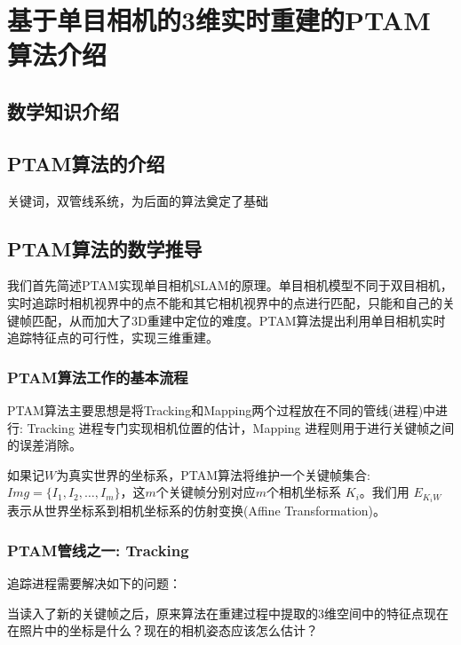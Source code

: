 
\def \R2{\mathbb{R}^2}
\def \R3{\mathbb{R}^3}
\def \Rn{\mathbb{R}^n}

\def \itW{\mathit{W}}

\def \itK{\mathit{K}}
\def \bfp{\mathbf{p}}

\chapter{基于单目相机的3维实时重建的PTAM算法介绍}

\section{数学知识介绍}

\section{PTAM算法的介绍}
关键词，双管线系统，为后面的算法奠定了基础

\section{PTAM算法的数学推导}
我们首先简述PTAM实现单目相机SLAM的原理。单目相机模型不同于双目相机，实时追踪时相机视界中的点不能和其它相机视界中的点进行匹配，只能和自己的关键帧匹配，从而加大了3D重建中定位的难度。PTAM算法提出利用单目相机实时追踪特征点的可行性，实现三维重建。

\subsection{PTAM算法工作的基本流程}
PTAM算法主要思想是将Tracking和Mapping两个过程放在不同的管线(进程)中进行: Tracking 进程专门实现相机位置的估计，Mapping 进程则用于进行关键帧之间的误差消除。

如果记$\itW$为真实世界的坐标系，PTAM算法将维护一个关键帧集合: $Img=\{I_1,I_2,\ldots,I_m\}$，这\(m\)个关键帧分别对应\(m\)个相机坐标系 $\itK_i$。我们用 $E_{\itK_i\itW}$ 表示从世界坐标系到相机坐标系的仿射变换(Affine Transformation)。

\subsection{PTAM管线之一: Tracking}

%
%
追踪进程需要解决如下的问题：

当读入了新的关键帧之后，原来算法在重建过程中提取的3维空间中的特征点现在在照片中的坐标是什么？现在的相机姿态应该怎么估计？ 

